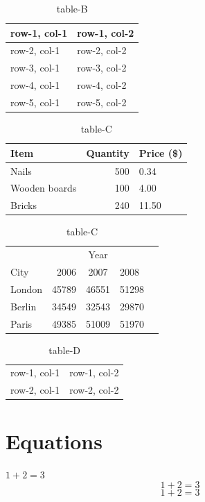 \documentclass[a4paper,12pt]{article}
\begin{document}
\begin{table}[H]
\centering
\begin{tabular}{|l|l|}
row-1, col-1 & row-1, col-2 \\
\hline
row-2, col-1 & row-2, col-2 \\
\cline{1-1}
row-3, col-1 & row-3, col-2 \\
\cline{2-2}
row-4, col-1 & row-4, col-2 \\
\hline \hline
row-5, col-1 & row-5, col-2 \\
\hline
\end{tabular}
\caption{table-B}
\end{table}

\begin{table}[H]
\centering
\begin{tabular}{l|r|l}
Item & Quantity & Price (\$) \\
\hline
Nails & 500 & 0.34 \\
Wooden boards & 100 & 4.00 \\
Bricks & 240 & 11.50 \\
\end{tabular}
\caption{table-C}
\end{table}


\begin{table}[H]
\centering
\begin{tabular}{l|rcll}
& & Year \\
\cline{2-4}
City & 2006 & 2007 & 2008 \\
\hline
London & 45789 & 46551 & 51298 \\
Berlin & 34549 & 32543 & 29870 \\
Paris & 49385 & 51009 & 51970 \\
\end{tabular}
\caption{table-C}
\end{table}

\begin{table}[H]
\centering
\begin{tabular}{|l|l|}
row-1, col-1 & row-1, col-2 \\
row-2, col-1 & row-2, col-2 \\
\end{tabular}
\caption{table-D}
\end{table}

\section{Equations}

$1+2=3$
$$1+2=3$$
\begin{equation}
1+2=3
\end{equation}
\end{document}
